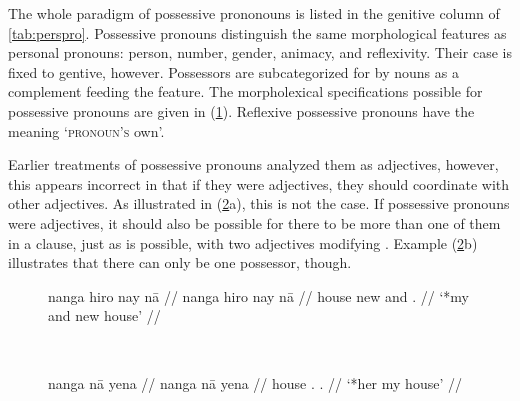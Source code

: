 The whole paradigm of possessive prononouns is listed in the genitive column of
\autoref{tab:perspro}. Possessive pronouns distinguish the same morphological
features as personal pronouns: person, number, gender, animacy, and
reflexivity. Their case is fixed to gentive, however. Possessors are
subcategorized for by nouns as a complement feeding the \Poss{} feature. The
morpholexical specifications possible for possessive pronouns are given in
(\ref{ex:posspromorphlex}). Reflexive possessive pronouns have the meaning
`\textsc{pronoun's} own'.

\begin{figure}[h]
\begin{morphlex}
\ex\label{ex:posspromorphlex}
\xe
\end{morphlex}
\end{figure}

Earlier treatments of possessive pronouns analyzed them as adjectives, however,
this appears incorrect in that if they were adjectives, they should coordinate
with other adjectives. As illustrated in (\ref{ex:possnoadj}a), this is not the
case. If possessive pronouns were adjectives, it should also be possible for
there to be more than one of them in a clause, just as  is
possible, with two adjectives modifying . Example (\ref{ex:possnoadj}b)
illustrates that there can only be one possessor, though.

\begin{figure}[h]
\ex{}\label{ex:possnoadj}
\begin{minipage}[t]{.5\remaining}
\tl\quad\ljudge*\begingl
	\gla nanga hiro nay nā //
	\glb nanga hiro nay nā //
	\glc house new and \Fsg{}.\Gen{} //
	\glft `*my and new house' //
\endgl
\end{minipage}
~
\begin{minipage}[t]{.5\remaining}
\tl\quad\ljudge*\begingl
	\gla nanga nā yena //
	\glb nanga nā yena //
	\glc house \Fsg{}.\Gen{} \TsgF{}.\Gen{} //
	\glft `*her my house' //
\endgl
\end{minipage}
\xe
\end{figure}

